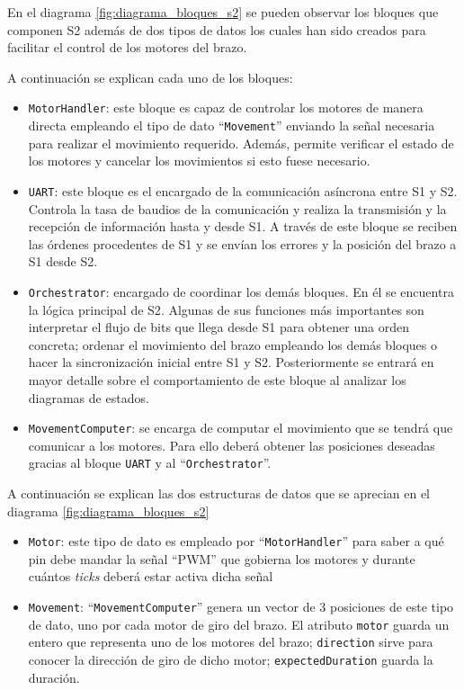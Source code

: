 En el diagrama \ref{fig:diagrama_bloques_s2} se pueden observar los bloques que componen \ac{S2} además de dos tipos de datos los cuales han sido creados para facilitar el control de los motores del brazo.

A continuación se explican cada uno de los bloques:

\begin{itemize}
    \item \texttt{MotorHandler}: este bloque es capaz de controlar los motores de manera directa empleando el tipo de dato ``\texttt{Movement}'' enviando la señal necesaria para realizar el movimiento requerido. Además, permite verificar el estado de los motores y cancelar los movimientos si esto fuese necesario.
    
    \item \texttt{UART}: este bloque es el encargado de la comunicación asíncrona entre \ac{S1} y \ac{S2}. Controla la tasa de baudios de la comunicación y realiza la transmisión y la recepción de información hasta y desde \ac{S1}. A través de este bloque se reciben las órdenes procedentes de \ac{S1} y se envían los errores y la posición del brazo a S1 desde \ac{S2}.
    
    \item \texttt{Orchestrator}: encargado de coordinar los demás bloques. En él se encuentra la lógica principal de \ac{S2}. Algunas de sus funciones más importantes son interpretar el flujo de bits que llega desde S1 para obtener una orden concreta; ordenar el movimiento del brazo empleando los demás bloques o hacer la sincronización inicial entre \ac{S1} y  \ac{S2}. Posteriormente se entrará en mayor detalle sobre el comportamiento de este bloque al analizar los diagramas de estados.
    
    \item \texttt{MovementComputer}: se encarga de computar el movimiento que se tendrá que comunicar a los motores. Para ello deberá obtener las posiciones deseadas gracias al bloque \texttt{UART} y al ``\texttt{Orchestrator}''.
\end{itemize}

A continuación se explican las dos estructuras de datos que se aprecian en el diagrama \ref{fig:diagrama_bloques_s2}

\begin{itemize}
    \item \texttt{Motor}: este tipo de dato es empleado por ``\texttt{MotorHandler}'' para saber a qué pin debe mandar la señal ``\ac{PWM}'' que gobierna los motores y durante cuántos \textit{ticks} deberá estar activa dicha señal
    
    \item \texttt{Movement}: ``\texttt{MovementComputer}'' genera un vector de 3 posiciones de este tipo de dato, uno por cada motor de giro del brazo. El atributo \texttt{motor} guarda un entero que representa uno de los motores del brazo; \texttt{direction} sirve para conocer la dirección de giro de dicho motor; \texttt{expectedDuration} guarda la duración.
\end{itemize}

